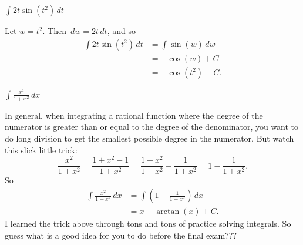 \documentclass[nooutcomes, handout]{ximera}
\renewcommand{\d}{\,d}
\begin{document}
	
\begin{problem}
$\int 2t \sin \left( t^2 \right) \d t$
  \begin{freeResponse}
    Let $w=t^2$.  Then $\d w = 2t \d t$, and so
    \begin{align*}
      \int 2t \sin(t^2) \d t &= \int \sin(w) \d w  \\
                             &= - \cos(w) + C  \\
                             &= - \cos(t^2) + C.
    \end{align*}
  \end{freeResponse}
\end{problem}

\begin{problem}
  $\int \frac{x^2 }{1 + x^2} \d x$
  \begin{freeResponse}
    In general, when integrating a rational function where the degree
    of the numerator is greater than or equal to the degree of the
    denominator, you want to do long division to get the smallest
    possible degree in the numerator.  But watch this slick little
    trick:
    \begin{equation*}
      \frac{x^2}{1+x^2} = \frac{1 + x^2 - 1}{1+x^2} = \frac{1+x^2}{1+x^2} - \frac{1}{1+x^2} = 1 - \frac{1}{1+x^2}.
    \end{equation*}
    So
    \begin{align*}
      \int \frac{x^2 }{1 + x^2} \d x &= \int \left( 1 - \frac{1}{1+x^2} \right) \d x  \\
                                     &= x - \arctan(x) + C.
    \end{align*}
    I learned the trick above through tons and tons of practice
    solving integrals.  So guess what is a good idea for you to do
    before the final exam???
  \end{freeResponse}

\end{problem}
\end{document}
